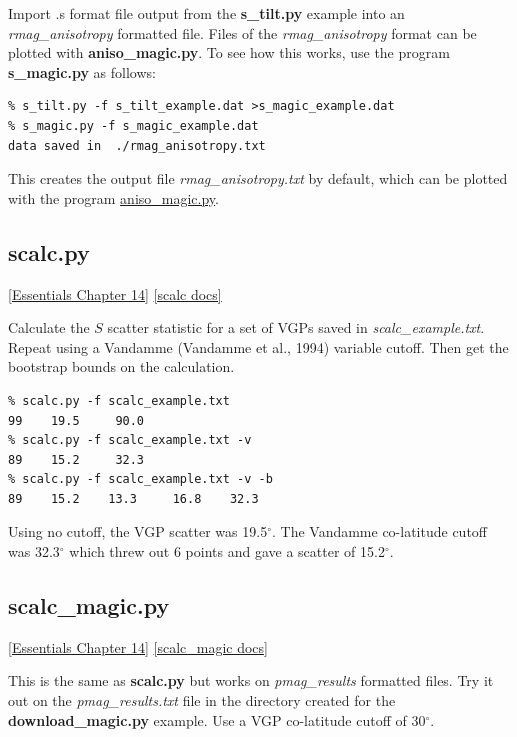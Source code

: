 \documentclass[11pt]{book}
\begin{document}
{Import .s format file output from the {\bf s\_tilt.py} example into an {\it rmag\_anisotropy} formatted file.  Files of the {\it rmag\_anisotropy} format can be plotted  with {\bf aniso\_magic.py}.   To see how this works,  use the program {\bf s\_magic.py} as follows:

\begin{verbatim}
% s_tilt.py -f s_tilt_example.dat >s_magic_example.dat
% s_magic.py -f s_magic_example.dat
data saved in  ./rmag_anisotropy.txt
\end{verbatim}

This creates the output file {\it rmag\_anisotropy.txt}  by default, which can be plotted with the program \href{#aniso_magic.py}{aniso\_magic.py}.



\subsection{scalc.py}
\href{http://earthref.org/MAGIC/books/Tauxe/Essentials/WebBook3ch14.html#ch14}{[Essentials Chapter 14]}
\href{https://github.com/PmagPy/PmagPy/blob/master/programs/scalc.py}{[scalc docs]}


Calculate the $S$ scatter statistic for a set of VGPs saved in {\it scalc\_example.txt}.  Repeat using a Vandamme (Vandamme et al., 1994) \nocite{vandamme94} variable cutoff.  Then get the bootstrap bounds on the calculation.

\begin{verbatim}
% scalc.py -f scalc_example.txt
99    19.5     90.0
% scalc.py -f scalc_example.txt -v
89    15.2     32.3
% scalc.py -f scalc_example.txt -v -b
89    15.2    13.3     16.8    32.3
\end{verbatim}

Using no cutoff, the VGP scatter was 19.5$^{\circ}$.  The Vandamme co-latitude cutoff was 32.3$^{\circ}$ which threw out 6 points and gave a scatter of 15.2$^{\circ}$.


\subsection{scalc\_magic.py}
\href{http://earthref.org/MAGIC/books/Tauxe/Essentials/WebBook3ch14.html#ch14}{[Essentials Chapter 14]}
\href{https://github.com/PmagPy/PmagPy/blob/master/programs/scalc_magic.py}{[scalc\_magic docs]}

This is the same as {\bf scalc.py} but works on {\it pmag\_results} formatted files.   Try it out on the {\it pmag\_results.txt} file in the directory created for the {\bf download\_magic.py} example. Use a VGP co-latitude cutoff of 30$^{\circ}$.

}
\end{document}
